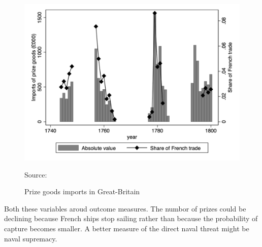 \documentclass[12pt,a4paper,notitlepage,english]{article}
\newcommand{\source}[1]{\caption*{\footnotesize Source: {#1}} }
\begin{document}
\begin{center}
	\begin{figure}[H]
		\caption{Prize goods imports in Great-Britain}
		\label{Prize goods imports}
		\centering
		\includegraphics[scale=0.7]{Prizes_imports.png}
		\source{\cite{Ashton1960}}
	\end{figure}
\end{center}


Both these variables aroud outcome measures. 
The numbor of prizes could be declining because French ships stop sailing rather than because the probability of capture becomes smaller. A better measure of the direct naval threat might be naval supremacy.
\end{document}
